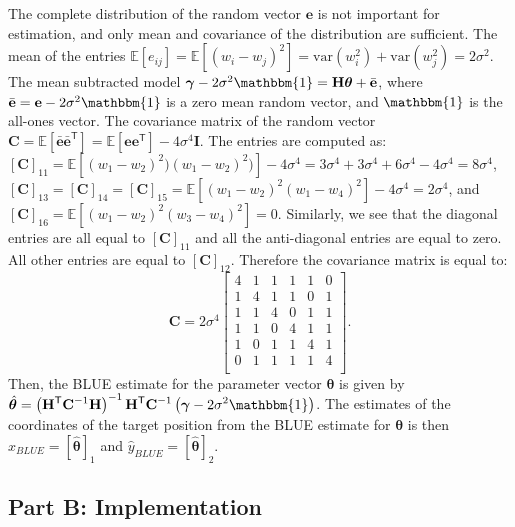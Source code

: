 \documentclass[11pt]{article}
\newcommand{\be}{\mathbf{e}}
\newcommand{\bI}{\mathbf{I}}
\newcommand{\bH}{\mathbf{H}}
\newcommand{\bC}{\mathbf{C}}
\newcommand{\Ex}{\mathbb{E}}
\newcommand{\TT}{\mathsf{T}}
\newcommand{\btheta}{\boldsymbol{\theta}}
\newcommand{\bgamma}{\boldsymbol{\gamma}}
\begin{document}
The complete distribution of the random vector $\be$ is not important for estimation, and only mean and covariance of the distribution are sufficient. The mean of the entries $\Ex[e_{ij}] = \Ex[(w_{i} - w_{j})^{2}] = \mathrm{var}(w_{i}^{2}) + \mathrm{var}(w_{j}^{2}) = 2\sigma^{2}$. The mean subtracted model $\bgamma - 2\sigma^{2} \mathbbm{1} = \bH\btheta + \bar{\be}$, where $\bar{\be} = \be - 2\sigma^{2}\mathbbm{1}$ is a zero mean random vector, and $\mathbbm{1}$ is the all-ones vector. The covariance matrix of the random vector $\bC = \Ex[\bar{\be}\bar{\be}^{\TT}] = \Ex[\be \be^{\TT}] - 4\sigma^{4} \bI$. The entries are computed as: $[\bC]_{11} = \Ex[(w_{1}-w_{2})^{2})(w_{1}-w_{2})^{2})] - 4\sigma^{4} = 3\sigma^{4} + 3\sigma^{4} + 6\sigma^{4} - 4\sigma^{4} = 8\sigma^{4}$, $[\bC]_{13} = [\bC]_{14} = [\bC]_{15} = \Ex[(w_{1}-w_{2})^{2}(w_{1}-w_{4})^{2}]-4\sigma^{4} = 2\sigma^{4}$, and $[\bC]_{16} = \Ex[(w_{1}-w_{2})^{2}(w_{3}-w_{4})^{2}] = 0$. Similarly, we see that the diagonal entries are all equal to $[\bC]_{11}$ and all the anti-diagonal entries are equal to zero. All other entries are equal to $[\bC]_{12}$. Therefore the covariance matrix is equal to:
\begin{equation}
	\bC = 2\sigma^{4} \begin{bmatrix}
		4 & 1 & 1 & 1 & 1 & 0 \\
		1 & 4 & 1 & 1 & 0 & 1 \\
		1 & 1 & 4 & 0 & 1 & 1 \\
		1 & 1 & 0 & 4 & 1 & 1 \\
		1 & 0 & 1 & 1 & 4 & 1 \\
		0 & 1 & 1 & 1 & 1 & 4 \\
	\end{bmatrix}.
\label{eq:blueCov}
\end{equation}
Then, the BLUE estimate for the parameter vector $\btheta$ is given by $\displaystyle \hat{\btheta} = \left( \bH^{\TT} \bC^{-1}\bH \right)^{-1} \bH^{\TT} \bC^{-1} \left( \bgamma - 2\sigma^{2} \mathbbm{1} \right)$. The estimates of the coordinates of the target position from the BLUE estimate for $\btheta$ is then $\hat{x}_{BLUE} = [\hat{\btheta}]_{1}$ and $\hat{y}_{BLUE} = [\hat{\btheta}]_{2}$.


\subsection*{Part B: Implementation}
\label{subsec:partB}
\end{document}
